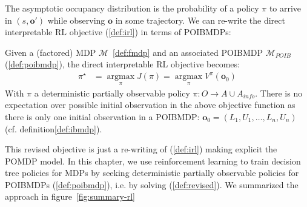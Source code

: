 The asymptotic occupancy distribution is the probability of a policy $\pi$ to arrive in $(s,\boldsymbol{o}')$ while observing $\boldsymbol{o}$ in some trajectory.  
We can re-write the direct interpretable RL objective (\ref{def:irl}) in terms of POIBMDPs:

\begin{definition}\label{def:revised}
    Given a (factored) MDP $\mathcal{M}$~\ref{def:fmdp} and an associated POIBMDP $\mathcal{M}_{POIB}$ (\ref{def:poibmdp}), the direct interpretable RL objective becomes:
\begin{align}
    \pi^{\star} &= \underset{\pi}{\operatorname{argmax}}J(\pi) = \underset{\pi}{\operatorname{argmax}}V^{\pi}(\boldsymbol{o}_0)
\end{align}
With $\pi$ a deterministic partially observable policy $\pi:O\rightarrow A\cup A_{info}$. There is no expectation over possible initial observation in the above objective function as there is only one initial observation in a POIBMDP: $\boldsymbol{o}_0=(L_1, U_1, \dots, L_n, U_n)$ (cf. definition\ref{def:ibmdp}).
\end{definition}
This revised objective is just a re-writing of (\ref{def:irl}) making explicit the POMDP model.
In this chapter, we use reinforcement learning to train decision tree policies for MDPs by seeking deterministic partially observable policies for POIBMDPs (\ref{def:poibmdp}), i.e. by solving (\ref{def:revised}).
We summarized the approach in figure~\ref{fig:summary-rl}  

